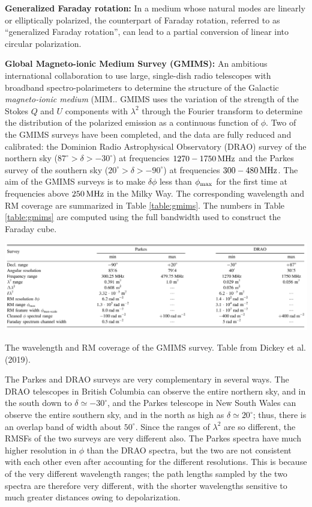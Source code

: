 \documentclass[a4paper,10pt]{article}
\begin{document}
{\noindent}\textbf{Generalized Faraday rotation:} In a medium whose natural modes are linearly or elliptically polarized, the counterpart of Faraday rotation, referred to as ``generalized Faraday rotation'', can lead to a partial conversion of linear into circular polarization.

{\noindent}\textbf{Global Magneto-ionic Medium Survey (GMIMS):} An ambitious international collaboration to use large, single-dish radio telescopes with broadband spectro-polarimeters to determine the structure of the Galactic \textit{magneto-ionic medium} (MIM.. GMIMS uses the variation of the strength of the Stokes $Q$ and $U$ components with $\lambda^2$ through the Fourier transform to determine the distribution of the polarized emission as a continuous function of $\phi$. Two of the GMIMS surveys have been completed, and the data are fully reduced and calibrated: the Dominion Radio Astrophysical Observatory (DRAO) survey of the northern sky ($87^\circ>\delta>-30^\circ$) at frequencies $1270-1750\,{\rm MHz}$ and the Parkes survey of the southern sky ($20^\circ>\delta>-90^\circ$) at frequencies $300-480\,{\rm MHz}$. The aim of the GMIMS surveys is to make $\delta\phi$ less than $\phi_{\rm max}$ for the first time at frequencies above $250\,{\rm MHz}$ in the Milky Way. The corresponding wavelength and RM coverage are summarized in Table \ref{table:gmims}. The numbers in Table \ref{table:gmims} are computed using the full bandwidth used to construct the Faraday cube.

\begin{table}[h]
\begin{center}
\includegraphics[width=16cm]{figures/GMIMStable.png}
\caption{\footnotesize{The wavelength and RM coverage of the GMIMS survey. Table from Dickey et al. (2019).}}
\label{table:gmims}
\end{center}
\end{table}

{\noindent}The Parkes and DRAO surveys are very complementary in several ways. The DRAO telescopes in British Columbia can observe the entire northern sky, and in the south down to $\delta\simeq-30^\circ$, and the Parkes telescope in New South Wales can observe the entire southern sky, and in the north as high as $\delta\simeq20^\circ$; thus, there is an overlap band of width about $50^\circ$. Since the ranges of $\lambda^2$ are so different, the RMSFs of the two surveys are very different also. The Parkes spectra have much higher resolution in $\phi$ than the DRAO spectra, but the two are not consistent with each other even after accounting for the different resolutions. This is because of the very different wavelength ranges; the path lengths sampled by the two spectra are therefore very different, with the shorter wavelengths sensitive to much greater distances owing to depolarization.
\end{document}
